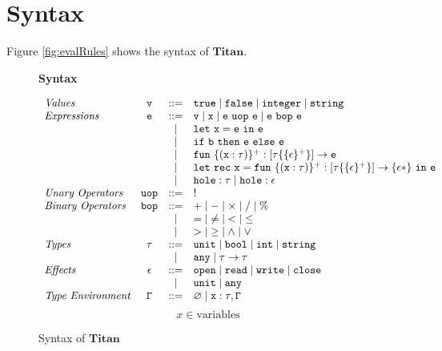 \documentclass[12pt, a4paper, titlepage]{report}
\begin{document}
  \section{Syntax}
    Figure \ref{fig:evalRules} shows the syntax of $\mathbf{Titan}$.
    \begin{figure}[htbp]
      \centering
      \begin{flushleft}
        \textbf{Syntax}
      \end{flushleft}
      \[
      \begin{array}{lccl}
        \emph{Values} &
          \mathtt{v} & ::= & \mathtt{true \mid false \mid integer \mid string }\\
        \emph{Expressions} &
          \mathtt{e} & ::= & \mathtt{v} \mid \mathtt{x} \mid \mathtt{e\ uop\ e \mid e\ bop\ e} \\
          & & \mid & \mathtt{let}\ \mathtt{x = e}\ \mathtt{in}\ \mathtt{e} \\
          & & \mid & \mathtt{if}\ \mathtt{b}\ \mathtt{then}\ \mathtt{e}\ \mathtt{else}\ \mathtt{e} \\
          & & \mid & \mathtt{fun}\ \mathtt{\{(x : \tau)\}^{+} : [\tau \{\{\epsilon\}^{+}\}] \to e} \\
          & & \mid & \mathtt{let\ rec}\ \mathtt{x} = \mathtt{fun}\ \mathtt{\{(x : \tau)\}^{+} : [\tau \{\{\epsilon\}^{+}\}] \to \{\epsilon*\}}\ \mathtt{in}\ \mathtt{e} \\
          & & \mid & \mathtt{hole : \tau} \mid \mathtt{hole : \epsilon}\\
        \emph{Unary Operators} &
          \mathtt{uop} & ::= & ! \\
        \emph{Binary Operators} &
          \mathtt{bop} & ::= & \mathtt{+} \mid \mathtt{-} \mid \mathtt{\times} \mid \mathtt{/} \mid \mathtt{\%} \\
          & & \mid & \mathtt{=} \mid \mathtt{\neq} \mid \mathtt{<} \mid \mathtt{\leq} \\
          & & \mid & \mathtt{>} \mid \mathtt{\geq} \mid \mathtt{\land} \mid \mathtt{\lor} \\
        \emph{Types} &
          \mathtt{\tau} & ::= & \mathtt{unit \mid bool \mid int \mid string} \\
          & & \mid & \mathtt{any \mid \tau \to \tau} \\
        \emph{Effects} &
          \mathtt{\epsilon} & ::= & \mathtt{open \mid read \mid write \mid close} \\
          & & \mid & \mathtt{unit \mid any} \\
        \emph{Type Environment} &
          \mathtt{\Gamma} & ::= & \mathtt{\varnothing \mid x : \tau, \Gamma} \\
      \end{array}
      \]
      \[
        x \in \textrm{variables}
      \]
      \caption{Syntax of $\mathbf{Titan}$}
      \label{fig:syntax}
    \end{figure}
\end{document}
